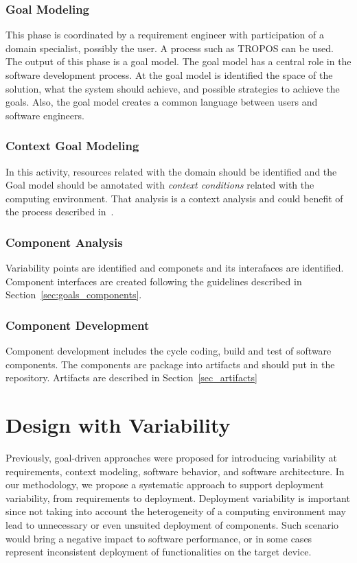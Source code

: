\subsubsection{Goal Modeling}
This phase is coordinated by a requirement engineer with participation of a domain specialist, possibly the user.
A process such as TROPOS can be used. The output of this phase is a goal model.
The goal model has a central role in the software development process. At the goal model is identified the space of the solution, what the system should achieve, and possible strategies to achieve the goals. Also, the goal model creates a common language between users and software engineers.

\subsubsection{Context Goal Modeling}
In this activity, resources related with the domain should be identified and the Goal model should be annotated with \emph{context conditions} related with the computing environment. That analysis is a context analysis and could benefit of the process described in~\cite{ali_goal-based_2010}.

\subsubsection{Component Analysis}

Variability points are identified and componets and its interafaces are identified. Component interfaces are created following the guidelines described in Section~\ref{sec:goals_components}.

\subsubsection{Component Development}

Component development includes the cycle coding, build and test of software components.
The components are package into artifacts and should put in the repository. Artifacts are described in Section~\ref{sec_artifacts}

\section{Design with Variability}

Previously, goal-driven  approaches were proposed for introducing variability at requirements, context modeling, software behavior, and software architecture\cite{angelopoulos_capturing_2015}\cite{yu_goals_2008}.
In our methodology, we propose a systematic approach to support deployment variability, from requirements to deployment.
Deployment variability is important since not taking into account the heterogeneity of a computing environment may lead to unnecessary or even unsuited deployment of components.
Such scenario would bring a negative impact to software performance, or in some cases represent inconsistent deployment of functionalities on the target device.

